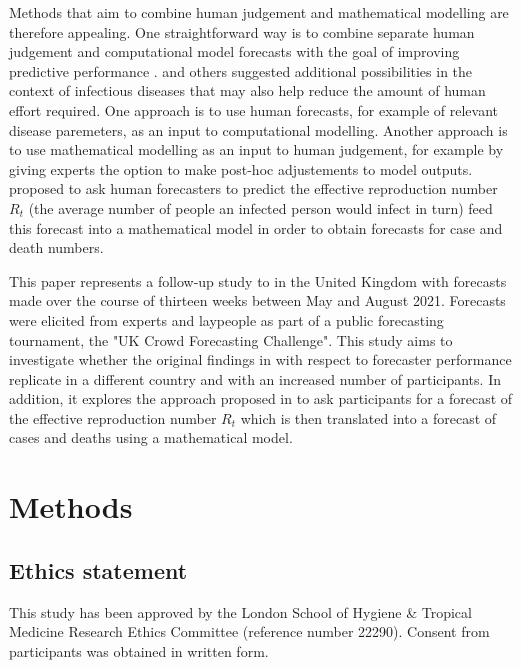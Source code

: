 \documentclass[10pt,a4paper,twocolumn]{article}
\begin{document}
Methods that aim to combine human judgement and mathematical modelling are therefore appealing. One straightforward way is to combine separate human judgement and computational model forecasts with the goal of improving predictive performance \citep{mcandrewChimericForecastingCombining2022}. \cite{farrowHumanJudgmentApproach2017, bosseComparingHumanModelbased2022} and others suggested additional possibilities in the context of infectious diseases that may also help reduce the amount of human effort required. One approach is to use human forecasts, for example of relevant disease paremeters, as an input to computational modelling. Another approach is to use mathematical modelling as an input to human judgement, for example by giving experts the option to make post-hoc adjustements to model outputs. \cite{bosseComparingHumanModelbased2022} proposed to ask human forecasters to predict the effective reproduction number $R_t$ (the average number of people an infected person would infect in turn) feed this forecast into a mathematical model in order to obtain forecasts for case and death numbers. 

This paper represents a follow-up study to \cite{bosseComparingHumanModelbased2022} in the United Kingdom with forecasts made over the course of thirteen weeks between May and August 2021. Forecasts were elicited from experts and laypeople as part of a public forecasting tournament, the "UK Crowd Forecasting Challenge". This study aims to investigate whether the original findings in \cite{bosseComparingHumanModelbased2022} with respect to forecaster performance replicate in a different country and with an increased number of participants. In addition, it explores the approach proposed in \cite{bosseComparingHumanModelbased2022} to ask participants for a forecast of the effective reproduction number $R_t$ which is then translated into a forecast of cases and deaths using a mathematical model. 

\section*{Methods}

\subsection*{Ethics statement}
This study has been approved by the London School of Hygiene \& Tropical Medicine Research Ethics Committee (reference number 22290). Consent from participants was obtained in written form.
\end{document}
